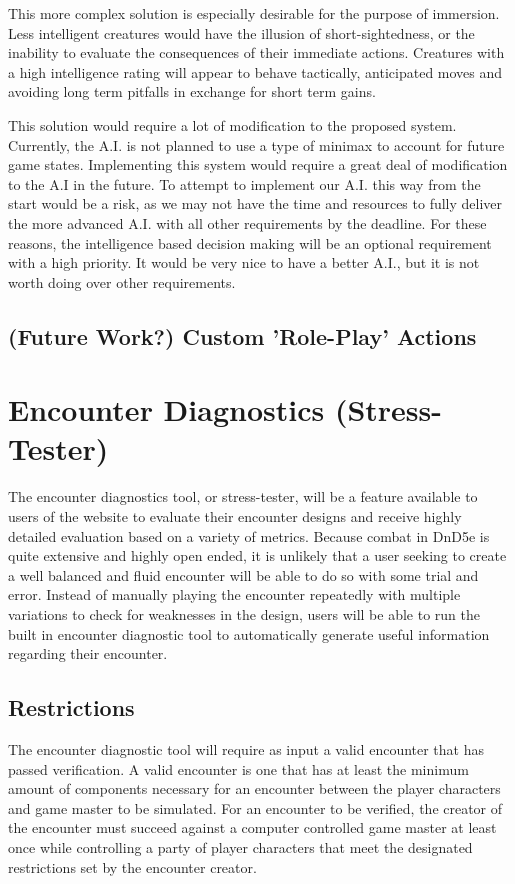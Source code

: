 \documentclass[12pt,a4paper]{report}
\begin{document}
		This more complex solution is especially desirable for the purpose of immersion. Less intelligent creatures would have the illusion of short-sightedness, or the inability to evaluate the consequences of their immediate actions. Creatures with a high intelligence rating will appear to behave tactically, anticipated moves and avoiding long term pitfalls in exchange for short term gains. 
		
		This solution would require a lot of modification to the proposed system. Currently, the A.I. is not planned to use a type of minimax to account for future game states. Implementing this system would require a great deal of modification to the A.I in the future. To attempt to implement our A.I. this way from the start would be a risk, as we may not have the time and resources to fully deliver the more advanced A.I. with all other requirements by the deadline. For these reasons, the intelligence based decision making will be an optional requirement with a high priority. It would be very nice to have a better A.I., but it is not worth doing over other requirements. 
		
		\subsection{(Future Work?) Custom 'Role-Play' Actions}
	
	\section{Encounter Diagnostics (Stress-Tester)}
	The encounter diagnostics tool, or stress-tester, will be a feature available to users of the website to evaluate their encounter designs and receive highly detailed evaluation based on a variety of metrics. Because combat in DnD5e is quite extensive and highly open ended, it is unlikely that a user seeking to create a well balanced and fluid encounter will be able to do so with some trial and error. Instead of manually playing the encounter repeatedly with multiple variations to check for weaknesses in the design, users will be able to run the built in encounter diagnostic tool to automatically generate useful information regarding their encounter. 
	
		\subsection{Restrictions}
		The encounter diagnostic tool will require as input a valid encounter that has passed verification. A valid encounter is one that has at least the minimum amount of components necessary for an encounter between the player characters and game master to be simulated. For an encounter to be verified, the creator of the encounter must succeed against a computer controlled game master at least once while controlling a party of player characters that meet the designated restrictions set by the encounter creator.  
		
\end{document}
